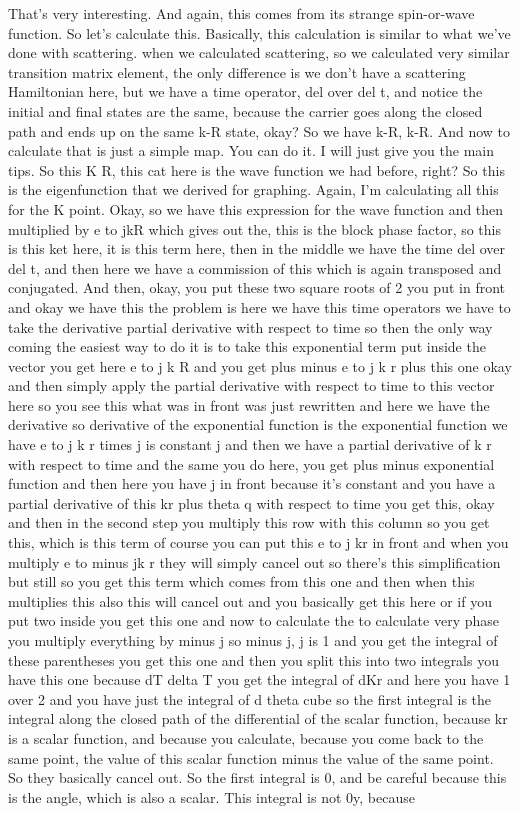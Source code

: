 That's very interesting. And again, this comes from its strange spin-or-wave function. So let's calculate this. Basically, this calculation is similar to what we've done with scattering. when we calculated scattering, so we calculated very similar transition matrix element, the only difference is we don't have a scattering Hamiltonian here, but we have a time operator, del over del t, and notice the initial and final states are the same, because the carrier goes along the closed path and ends up on the same k-R state, okay? So we have k-R, k-R. And now to calculate that is just a simple map. You can do it. I will just give you the main tips. So this K R, this cat here is the wave function we had before, right? So this is the eigenfunction that we derived for graphing. Again, I'm calculating all this for the K point. Okay, so we have this expression for the wave function and then multiplied by e to jkR which gives out the, this is the block phase factor, so this is this ket here, it is this term here, then in the middle we have the time del over del t, and then here we have a commission of this which is again transposed and conjugated. And then, okay, you put these two square roots of 2 you put in front and okay we have this the problem is here we have this time operators we have to take the derivative partial derivative with respect to time so then the only way coming the easiest way to do it is to take this exponential term put inside the vector you get here e to j k R and you get plus minus e to j k r plus this one okay and then simply apply the partial derivative with respect to time to this vector here so you see this what was in front was just rewritten and here we have the derivative so derivative of the exponential function is the exponential function we have e to j k r times j is constant j and then we have a partial derivative of k r with respect to time and the same you do here, you get plus minus exponential function and then here you have j in front because it's constant and you have a partial derivative of this kr plus theta q with respect to time you get this, okay and then in the second step you multiply this row with this column so you get this, which is this term of course you can put this e to j kr in front and when you multiply e to minus jk r they will simply cancel out so there's this simplification but still so you get this term which comes from this one and then when this multiplies this also this will cancel out and you basically get this here or if you put two inside you get this one and now to calculate the to calculate very phase you multiply everything by minus j so minus j, j is 1 and you get the integral of these parentheses you get this one and then you split this into two integrals you have this one because dT delta T you get the integral of dKr and here you have 1 over 2 and you have just the integral of d theta cube so the first integral is the integral along the closed path of the differential of the scalar function, because kr is a scalar function, and because you calculate, because you come back to the same point, the value of this scalar function minus the value of the same point. So they basically cancel out. So the first integral is 0, and be careful because this is the angle, which is also a scalar. This integral is not 0y, because 